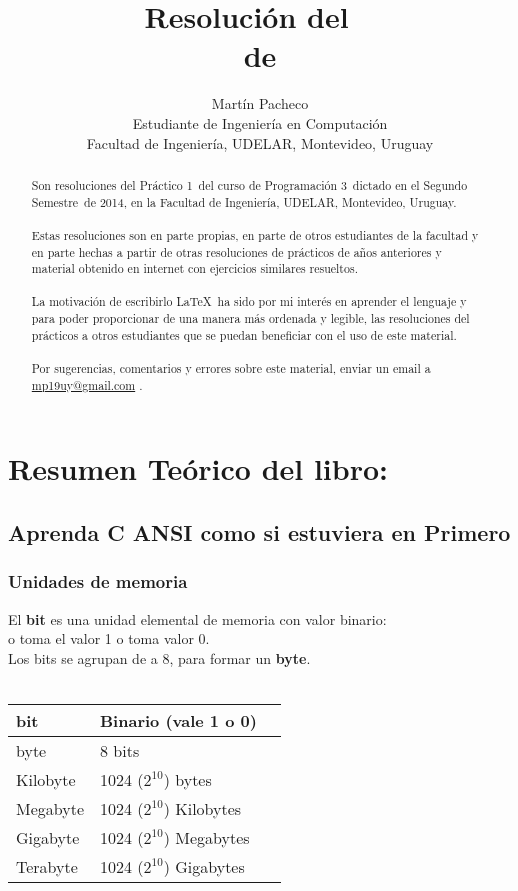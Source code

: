 \documentclass[letterpaper]{report}
\title{Resolución del \practico\ \\de \materia}
\author{Martín Pacheco\\Estudiante de Ingeniería en Computación\\Facultad de Ingeniería, UDELAR, Montevideo, Uruguay}
\date{\anio}
\newcommand{\materia}{Programación 3}
\newcommand{\practico}{Práctico 1}
\newcommand{\facultad}{Facultad de Ingeniería}
\newcommand{\semestre}{Segundo Semestre}
\newcommand{\anio}{2014}
\begin{document}
\maketitle
\def\abstractname{ Sobre este documento...}
\begin{abstract}
  Son resoluciones del \practico\ del curso de \materia\ dictado en el \semestre\ de \anio, en la \facultad, UDELAR, Montevideo, Uruguay. 
  \\\\
  Estas resoluciones son en parte propias, en parte de otros estudiantes de la facultad y en parte hechas a partir de otras resoluciones de prácticos de años anteriores y material obtenido en internet con ejercicios similares resueltos.
  \\\\
  La motivación de escribirlo \LaTeX\ ha sido por mi interés en aprender el lenguaje y para poder proporcionar de una manera más ordenada y legible, las resoluciones del prácticos a otros estudiantes que se puedan beneficiar con el uso de este material.
  \\\\
  Por sugerencias, comentarios y errores sobre este material, enviar un email a \href{mailto:mp19uy@gmail.com}{mp19uy@gmail.com} .
\end{abstract}

\section*{Resumen Teórico del libro:}\subsection*{Aprenda C ANSI como si estuviera en Primero}
\subsubsection*{Unidades de memoria}
El \textbf{bit} es una unidad elemental de memoria con valor binario: \\ o toma el valor 1 o toma valor 0.\\
Los bits se agrupan de a 8, para formar un \textbf{byte}.\\\\
\begin{tabular}{|l|l|c}
\hline bit & Binario (vale 1 o 0)\\
\hline byte & 8 bits \\
\hline Kilobyte & 1024 ($2^{10}$) bytes \\
\hline Megabyte & 1024 ($2^{10}$) Kilobytes\\
\hline Gigabyte & 1024 ($2^{10}$) Megabytes\\
\hline Terabyte & 1024 ($2^{10}$) Gigabytes\\
\hline 
\end{tabular}
\end{document}
